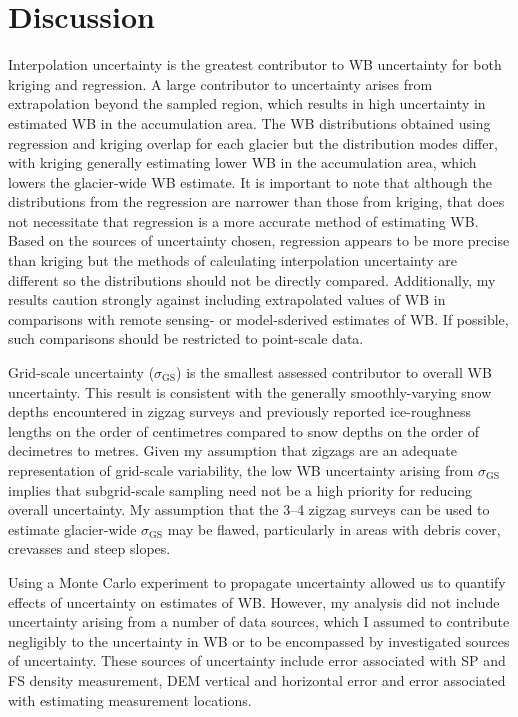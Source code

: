 \documentclass{sfuthesis}
\begin{document}
\section{Discussion}
\label{sec:Unc_discuss}


Interpolation uncertainty is the greatest contributor to WB uncertainty for both kriging and regression. A large contributor to uncertainty arises from extrapolation beyond the sampled region, which results in high uncertainty in estimated WB in the accumulation area. The WB distributions obtained using regression and kriging overlap for each glacier but the distribution modes differ, with kriging generally estimating lower WB in the accumulation area, which lowers the glacier-wide WB estimate. It is important to note that although the distributions from the regression are narrower than those from kriging, that does not necessitate that regression is a more accurate method of estimating WB. Based on the sources of uncertainty chosen, regression appears to be more precise than kriging but the methods of calculating interpolation uncertainty are different so the distributions should not be directly compared. Additionally, my results caution strongly against including extrapolated values of WB in comparisons with remote sensing- or model-sderived estimates of WB. If possible, such comparisons should be restricted to point-scale data.

Grid-scale uncertainty ($\sigma_{\mathrm{GS}}$) is the smallest assessed contributor to overall WB uncertainty. This result is consistent with the generally smoothly-varying snow depths encountered in zigzag surveys and previously reported ice-roughness lengths on the order of centimetres \citep[e.g.][]{Hock2005} compared to snow depths on the order of decimetres to metres. Given my assumption that zigzags are an adequate representation of grid-scale variability, the low WB uncertainty arising from $\sigma_{\mathrm{GS}}$ implies that subgrid-scale sampling need not be a high priority for reducing overall uncertainty. My assumption that the 3--4 zigzag surveys can be used to estimate glacier-wide $\sigma_{\mathrm{GS}}$ may be flawed, particularly in areas with debris cover, crevasses and steep slopes.

Using a Monte Carlo experiment to propagate uncertainty allowed us to quantify effects of uncertainty on estimates of WB. However, my analysis did not include uncertainty arising from a number of data sources, which I assumed to contribute negligibly to the uncertainty in WB or to be encompassed by investigated sources of uncertainty. These sources of uncertainty include error associated with SP and FS density measurement, DEM vertical and horizontal error and error associated with estimating measurement locations.
\end{document}
